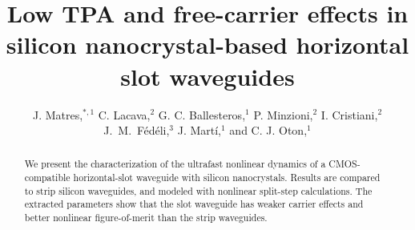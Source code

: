 \documentclass[10pt,letterpaper]{article}
\begin{document}
\title{Low TPA and free-carrier effects in silicon nanocrystal-based horizontal slot waveguides}
\author{J. Matres,$^{*,1}$ C. Lacava,$^2$ G. C. Ballesteros,$^1$ P. Minzioni,$^2$ I. Cristiani,$^2$ J.~M.~F\'ed\'eli,$^3$ J. Mart\'i,$^1$ and C. J. Oton,$^1$} 
\address{$^1$ Nanophotonics Technology Center, \\ Universidad Polit\'ecnica de Valencia, Camino de Vera s/n, 46022, Valencia, Spain\\
$^2$Dipartimento di Ingegneria Industriale e dell'Informazione, Universita di Pavia, Via Ferrata 1, 27100, Pavia, Italy\\
$^3$CEA LETI, Minatec Campus, Grenoble 38054, France}



\begin{abstract}
We present the characterization of the ultrafast nonlinear dynamics of a CMOS-compatible horizontal-slot waveguide with silicon nanocrystals. Results are compared to strip silicon waveguides, and modeled with nonlinear split-step calculations. The extracted parameters show that the slot waveguide has weaker carrier effects and better nonlinear figure-of-merit than the strip waveguides. 
\end{abstract}




%
\end{document}
